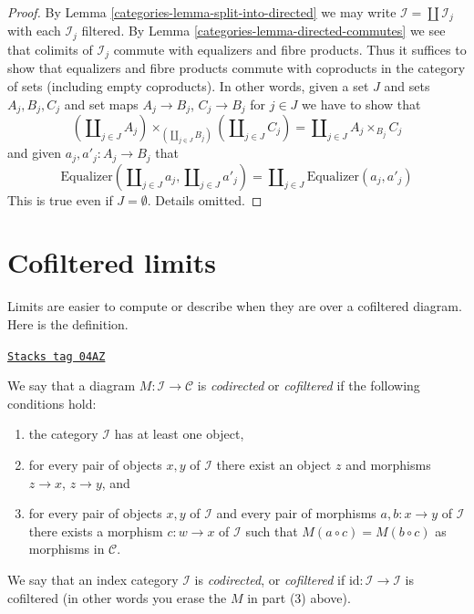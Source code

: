 \begin{proof}

By
Lemma \ref{categories-lemma-split-into-directed}
we may write $\mathcal{I} = \coprod \mathcal{I}_j$ with each $\mathcal{I}_j$
filtered. By
Lemma \ref{categories-lemma-directed-commutes}
we see that colimits of $\mathcal{I}_j$ commute with equalizers and
fibre products. Thus it suffices to show that equalizers and fibre products
commute with coproducts in the category of sets (including empty coproducts).
In other words, given a set $J$ and sets $A_j, B_j, C_j$ and set maps
$A_j \to B_j$, $C_j \to B_j$ for $j \in J$ we have to show that
$$
(\coprod\nolimits_{j \in J} A_j)
\times_{(\coprod\nolimits_{j \in J} B_j)}
(\coprod\nolimits_{j \in J} C_j)
=
\coprod\nolimits_{j \in J} A_j \times_{B_j} C_j
$$
and given $a_j, a'_j : A_j \to B_j$ that
$$
\text{Equalizer}(
\coprod\nolimits_{j \in J} a_j,
\coprod\nolimits_{j \in J} a'_j)
=
\coprod\nolimits_{j \in J}
\text{Equalizer}(a_j, a'_j)
$$
This is true even if $J = \emptyset$. Details omitted.
\end{proof}

\section{Cofiltered limits}
\label{categories-section-codirected-limits}
Limits are easier to compute or describe when they
are over a cofiltered diagram. Here is the definition.

\begin{definition}[Codirected]
\label{categories-definition-codirected}
\href{https://stacks.math.columbia.edu/tag/04AZ}{\texttt{Stacks tag 04AZ}}

We say that a diagram $M : \mathcal{I} \to \mathcal{C}$ is {\it codirected}
or {\it cofiltered} if the following conditions hold:
\begin{enumerate}
\item the category $\mathcal{I}$ has at least one object,
\item for every pair of objects $x, y$ of $\mathcal{I}$
there exist an object $z$ and morphisms $z \to x$,
$z \to y$, and
\item for every pair of objects $x, y$ of $\mathcal{I}$
and every pair of morphisms $a, b : x \to y$ of $\mathcal{I}$
there exists a morphism $c : w \to x$ of $\mathcal{I}$
such that $M(a \circ c) = M(b \circ c)$ as morphisms in $\mathcal{C}$.
\end{enumerate}
We say that an index category $\mathcal{I}$ is {\it codirected}, or
{\it cofiltered} if $\text{id} : \mathcal{I} \to \mathcal{I}$ is
cofiltered (in other words you erase the $M$ in part (3) above).
\end{definition}

